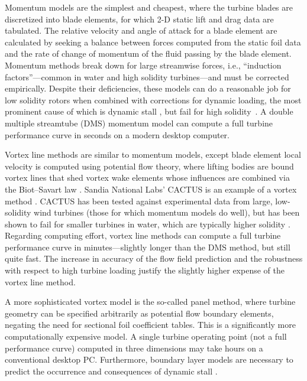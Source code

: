 Momentum models are the simplest and cheapest, where the turbine blades are
discretized into blade elements, for which 2-D static lift and drag data are
tabulated. The relative velocity and angle of attack for a blade element are
calculated by seeking a balance between forces computed from the static foil
data and the rate of change of momentum of the fluid passing by the blade
element. Momentum methods break down for large streamwise forces, i.e.,
``induction factors''---common in water and high solidity turbines---and must be
corrected empirically. Despite their deficiencies, these models can do a
reasonable job for low solidity rotors when combined with corrections for
dynamic loading, the most prominent cause of which is dynamic stall
\cite{Para2002}, but fail for high solidity~\cite{Joo2015}. A double multiple
streamtube (DMS) momentum model can compute a full turbine performance curve in
seconds on a modern desktop computer.

Vortex line methods are similar to momentum models, except blade element local
velocity is computed using potential flow theory, where lifting bodies are bound
vortex lines that shed vortex wake elements whose influences are combined via
the Biot--Savart law \cite{Strickland1979}. Sandia National Labs' CACTUS is an
example of a vortex method \cite{Murray2011}. CACTUS has been tested against
experimental data from large, low-solidity wind turbines (those for which
momentum models do well), but has been shown to fail for smaller turbines in
water, which are typically higher solidity \cite{Michelen2014}. Regarding
computing effort, vortex line methods can compute a full turbine performance
curve in minutes---slightly longer than the DMS method, but still quite fast.
The increase in accuracy of the flow field prediction and the robustness with
respect to high turbine loading justify the slightly higher expense of the
vortex line method.

A more sophisticated vortex model is the so-called panel method, where turbine
geometry can be specified arbitrarily as potential flow boundary elements,
negating the need for sectional foil coefficient tables. This is a significantly
more computationally expensive model. A single turbine operating point (not a
full performance curve) computed in three dimensions may take hours on a
conventional desktop PC. Furthermore, boundary layer models are necessary to
predict the occurrence and consequences of dynamic stall \cite{Zanon2012}.

